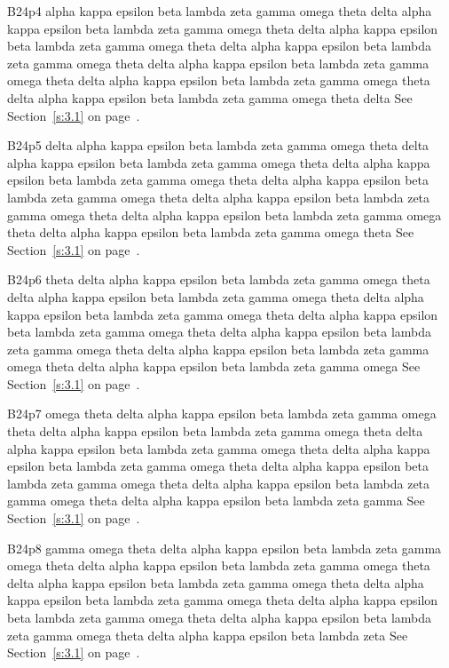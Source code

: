 B24p4 alpha kappa epsilon beta lambda zeta gamma omega theta delta alpha kappa epsilon beta lambda zeta gamma omega theta delta alpha kappa epsilon beta lambda zeta gamma omega theta delta alpha kappa epsilon beta lambda zeta gamma omega theta delta alpha kappa epsilon beta lambda zeta gamma omega theta delta alpha kappa epsilon beta lambda zeta gamma omega theta delta alpha kappa epsilon beta lambda zeta gamma omega theta delta See Section~\ref{s:3.1} on page~\pageref{s:3.1}.

B24p5 delta alpha kappa epsilon beta lambda zeta gamma omega theta delta alpha kappa epsilon beta lambda zeta gamma omega theta delta alpha kappa epsilon beta lambda zeta gamma omega theta delta alpha kappa epsilon beta lambda zeta gamma omega theta delta alpha kappa epsilon beta lambda zeta gamma omega theta delta alpha kappa epsilon beta lambda zeta gamma omega theta delta alpha kappa epsilon beta lambda zeta gamma omega theta See Section~\ref{s:3.1} on page~\pageref{s:3.1}.

B24p6 theta delta alpha kappa epsilon beta lambda zeta gamma omega theta delta alpha kappa epsilon beta lambda zeta gamma omega theta delta alpha kappa epsilon beta lambda zeta gamma omega theta delta alpha kappa epsilon beta lambda zeta gamma omega theta delta alpha kappa epsilon beta lambda zeta gamma omega theta delta alpha kappa epsilon beta lambda zeta gamma omega theta delta alpha kappa epsilon beta lambda zeta gamma omega See Section~\ref{s:3.1} on page~\pageref{s:3.1}.

B24p7 omega theta delta alpha kappa epsilon beta lambda zeta gamma omega theta delta alpha kappa epsilon beta lambda zeta gamma omega theta delta alpha kappa epsilon beta lambda zeta gamma omega theta delta alpha kappa epsilon beta lambda zeta gamma omega theta delta alpha kappa epsilon beta lambda zeta gamma omega theta delta alpha kappa epsilon beta lambda zeta gamma omega theta delta alpha kappa epsilon beta lambda zeta gamma See Section~\ref{s:3.1} on page~\pageref{s:3.1}.

B24p8 gamma omega theta delta alpha kappa epsilon beta lambda zeta gamma omega theta delta alpha kappa epsilon beta lambda zeta gamma omega theta delta alpha kappa epsilon beta lambda zeta gamma omega theta delta alpha kappa epsilon beta lambda zeta gamma omega theta delta alpha kappa epsilon beta lambda zeta gamma omega theta delta alpha kappa epsilon beta lambda zeta gamma omega theta delta alpha kappa epsilon beta lambda zeta See Section~\ref{s:3.1} on page~\pageref{s:3.1}.

